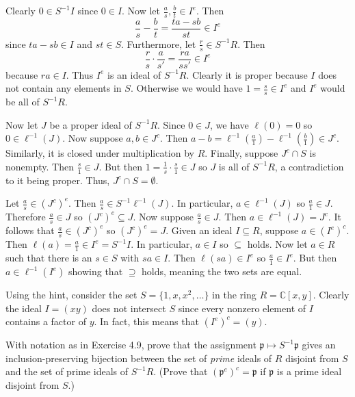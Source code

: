 \documentclass[../../master.tex]{subfiles}
\begin{document}
    \begin{solution}
        Clearly $0 \in S^{-1}I$ since $0 \in I$. Now let $\frac{a}{s},
        \frac{b}{t} \in I^{e}$. Then
        \[
        \frac{a}{s} - \frac{b}{t} = \frac{ta - sb}{st} \in I^{e}
        \] 
        since $ta - sb \in I$ and $st \in S$. Furthermore, let $\frac{r}{s} \in
        S^{-1}R$. Then
        \[
        \frac{r}{s} \cdot \frac{a}{s'} = \frac{ra}{ss'} \in I^{e}
        \] 
        because $ra \in I$. Thus $I^{e}$ is an ideal of $S^{-1}R$. Clearly it is
        proper because $I$ does not contain any elements in $S$. Otherwise we
        would have $1 = \frac{s}{s} \in I^{e}$ and $I^{e}$ would be all of
        $S^{-1}R$.

        Now let $J$ be a proper ideal of $S^{-1}R$. Since $0 \in J$, we have
        $\ell(0) = 0$ so $0 \in \ell^{-1}(J)$. Now suppose $a, b \in J^{c}$.
        Then $a - b = \ell^{-1}(\frac{a}{1}) - \ell^{-1}(\frac{b}{1}) \in
        J^{c}$. Similarly, it is closed under multiplication by $R$. Finally,
        suppose $J^{c} \cap S$ is nonempty. Then $\frac{s}{1} \in J$. But then
        $1 = \frac{1}{s} \cdot \frac{s}{1} \in J$ so $J$ is all of $S^{-1}R$, a
        contradiction to it being proper. Thus, $J^{c} \cap S = \emptyset$.

        Let $\frac{a}{s} \in (J^{c})^{e}$. Then $\frac{a}{s} \in
        S^{-1}\ell^{-1}(J)$. In particular, $a \in \ell^{-1}(J)$ so $\frac{a}{1}
        \in J$. Therefore $\frac{a}{s} \in J$ so $(J^{c})^{e} \subseteq J$. Now
        suppose $\frac{a}{s} \in J$. Then $a \in \ell^{-1}(J) = J^{c}$. It
        follows that $\frac{a}{s} \in (J^{c})^{e}$ so $(J^{c})^{e} = J$. Given
        an ideal $I \subseteq R$, suppose $a \in (I^{e})^{c}$. Then $\ell(a) =
        \frac{a}{1} \in I^{e} = S^{-1}I$. In particular, $a \in I$ so
        $\subseteq$ holds. Now let $a \in R$ such that there is an $s \in S$
        with $sa \in I$. Then $\ell(sa) \in I^{e}$ so $\frac{a}{1} \in I^{e}$.
        But then $a \in \ell^{-1}(I^{e})$ showing that $\supseteq$ holds,
        meaning the two sets are equal.

        Using the hint, consider the set $S = \{1, x, x^2, \ldots\}$ in the ring
        $R = \mathbb{C}[x, y]$. Clearly the ideal $I = (xy)$ does not intersect
        $S$ since every nonzero element of $I$ contains a factor of $y$. In
        fact, this means that $(I^{e})^{c} = (y)$.
    \end{solution}

    \begin{problem}
        With notation as in Exercise 4.9, prove that the assignment
        $\mathfrak{p} \mapsto S^{-1}\mathfrak{p}$ gives an inclusion-preserving
        bijection between the set of \textit{prime} ideals of $R$ disjoint from
        $S$ and the set of prime ideals of $S^{-1}R$. (Prove that
        $(\mathfrak{p}^{e})^{c} = \mathfrak{p}$ if $\mathfrak{p}$ is a prime
        ideal disjoint from $S$.)
    \end{problem}
\end{document}
